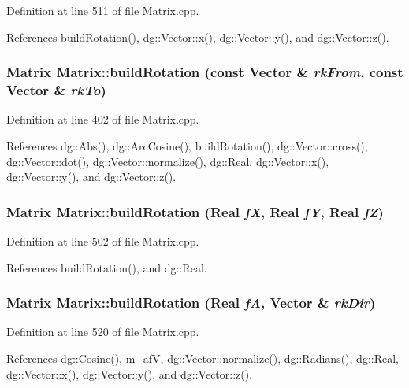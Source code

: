 Definition at line 511 of file Matrix.cpp.

References build\-Rotation(), dg::Vector::x(), dg::Vector::y(), and dg::Vector::z().
\subsubsection{\setlength{\rightskip}{0pt plus 5cm}Matrix Matrix::build\-Rotation (const {\bf Vector} \& {\em rk\-From}, const {\bf Vector} \& {\em rk\-To})\hspace{0.3cm}{\tt  [static]}}\label{classdg_1_1Matrix_d4}




Definition at line 402 of file Matrix.cpp.

References dg::Abs(), dg::Arc\-Cosine(), build\-Rotation(), dg::Vector::cross(), dg::Vector::dot(), dg::Vector::normalize(), dg::Real, dg::Vector::x(), dg::Vector::y(), and dg::Vector::z().
\subsubsection{\setlength{\rightskip}{0pt plus 5cm}Matrix Matrix::build\-Rotation ({\bf Real} {\em f\-X}, {\bf Real} {\em f\-Y}, {\bf Real} {\em f\-Z})\hspace{0.3cm}{\tt  [static]}}\label{classdg_1_1Matrix_d3}




Definition at line 502 of file Matrix.cpp.

References build\-Rotation(), and dg::Real.
\subsubsection{\setlength{\rightskip}{0pt plus 5cm}Matrix Matrix::build\-Rotation ({\bf Real} {\em f\-A}, {\bf Vector} \& {\em rk\-Dir})\hspace{0.3cm}{\tt  [static]}}\label{classdg_1_1Matrix_d2}




Definition at line 520 of file Matrix.cpp.

References dg::Cosine(), m\_\-af\-V, dg::Vector::normalize(), dg::Radians(), dg::Real, dg::Vector::x(), dg::Vector::y(), and dg::Vector::z().

